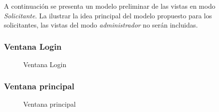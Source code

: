 \documentclass[12pt,a4paper]{article}
\begin{document}
A continuación se presenta un modelo preliminar de las vistas en modo \textit{Solicitante}. La ilustrar la idea principal del modelo propuesto para los solicitantes, las vistas del modo \textit{administrador} no serán incluidas.

\subsubsection*{Ventana Login}

\begin{figure}[H]
  \centering
  \caption{Ventana Login}
  \label{fig:vtnLogin}
\end{figure}

\subsubsection*{Ventana principal}

\begin{figure}[H]
  \centering
  \caption{Ventana principal}
  \label{fig:vtnPrincipal}
\end{figure}
\end{document}
